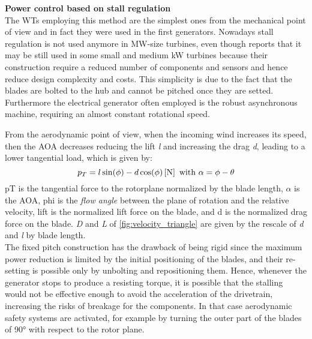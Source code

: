 \textbf{Power control based on stall regulation}\\
The \acrshort{WTs} employing this method are the simplest ones from the mechanical point of view and in fact they were used in the first generators. Nowadays stall regulation is not used anymore in MW-size turbines, even though \cite{Grasso_2016} reports that it may be still used in some small and medium kW turbines because their construction require a reduced number of components and sensors and hence reduce design complexity and costs. This simplicity is due to the fact that the blades are bolted to the hub and cannot be pitched once they are setted. Furthermore the electrical generator often employed is the robust asynchronous machine, requiring an almost constant rotational speed.

From the aerodynamic point of view, when the incoming wind increases its speed, then the \acrshort{AOA} decreases reducing the lift \textit{l} and increasing the drag \textit{d}, leading to a lower tangential load, which is given by:
\begin{equation}
  p_T = l \sin(\phi) - d \cos(\phi) \left[\si{\newton}\right] \text{ with } \alpha = \phi - \theta
  \label{eq:tangential_load}
\end{equation}
\acrshort{pT} is the tangential force to the rotorplane normalized by the blade length, $\alpha$ is the \acrshort{AOA}, \acrshort{phi} is the \textit{flow angle} between the plane of rotation and the relative velocity, \acrshort{lift} is the normalized lift force on the blade, and \acrshort{d} is the normalized drag force on the blade. \textit{D} and \textit{L} of \autoref{fig:velocity_triangle} are given by the rescale of \textit{d} and \textit{l} by blade length.\\
The fixed pitch construction has the drawback of being rigid since the maximum power reduction is limited by the initial positioning of the blades, and their re-setting is possible only by unbolting and repositioning them. Hence, whenever the generator stops to produce a resisting torque, it is possible that the stalling would not be effective enough to avoid the acceleration of the drivetrain, increasing the risks of breakage for the components. In that case aerodynamic safety systems are activated, for example by turning the outer part of the blades of 90$\si{\degree}$ with respect to the rotor plane. 

